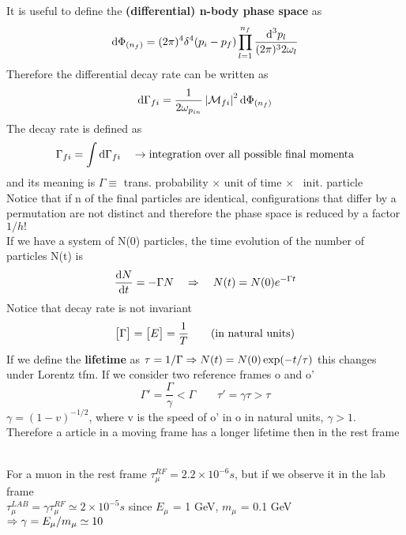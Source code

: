 It is useful to define the \textbf{(differential) n-body phase space} as
\[
\textup{d} \Phi_{(n_f)} = (2 \pi)^4 \delta^4 (p_i - p_f) \prod_{l=1}^{n_f} \frac{\textup{d}^3 p_l}{(2 \pi)^3 2 \omega_l}
\]
Therefore the differential decay rate can be written as
\[
\textup{d} \Gamma_{fi} = \frac{1}{2 \omega_{p_{in}}} \left\lvert \mathcal{M}_{fi} \right\rvert^2 \textup{d} \Phi_{(n_f)}
\]
The decay rate is defined as
\[
\Gamma_{fi} = \int \textup{d} \Gamma_{fi}
\quad
\to \textup{integration over all possible final momenta}
\]
and its meaning is $\Gamma \equiv$ trans. probability $\times$ unit of time $\times$ \ init. particle\\
Notice that if n of the final particles are identical, configurations that differ by a permutation are not distinct and therefore the phase space is reduced by a factor $1/h!$\\
If we have a system of N(0) particles, the time evolution of the number of particles N(t) is
\[
\frac{\textup{d} N}{\textup{d} t} = - \Gamma N
\quad \Rightarrow \quad
N(t) = N(0) e^{-\Gamma t}
\]
Notice that decay rate is not invariant
\[
\bigl[ \Gamma \bigr] = \bigl[ E \bigr] = \frac{1}{T}
\qquad
\textup{(in natural units)}
\]
If we define the \textbf{lifetime} as $\tau = 1/\Gamma \Rightarrow N(t) = N(0) \exp(-t/\tau)$ this changes under Lorentz tfm. If we consider two reference frames o and o'
\[
\Gamma' = \frac{\Gamma}{\gamma} < \Gamma
\qquad
\tau' = \gamma \tau > \tau
\]
$\gamma = (1 - v)^{-1/2}$, where v is the speed of o' in o in natural units, $\gamma > 1$. Therefore a article in a moving frame has a longer lifetime then in the rest frame\\ \\
\begin{example}
For a muon in the rest frame $\tau_{\mu}^{RF} = 2.2 \times 10^{-6} s$, but if we observe it in the lab frame \\
$\tau_{\mu}^{LAB} = \gamma \tau_{\mu}^{RF} \simeq 2 \times 10^{-5} s$ since $E_{\mu}$ = 1 GeV, $m_{\mu}$ = 0.1 GeV \\
$\Rightarrow \gamma = E_{\mu} / m_{\mu} \simeq 10$ 
\end{example}

